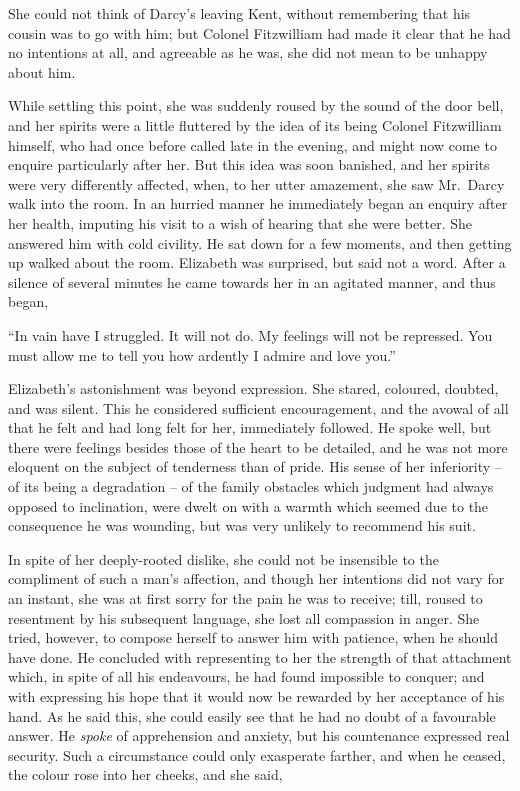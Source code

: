 She could not think of Darcy’s leaving Kent, without
remembering that his cousin was to go with him; but
Colonel Fitzwilliam had made it clear that he had no
intentions at all, and agreeable as he was, she did not
mean to be unhappy about him.

While settling this point, she was suddenly roused by
the sound of the door bell, and her spirits were a little
fluttered by the idea of its being Colonel Fitzwilliam
himself, who had once before called late in the evening,
and might now come to enquire particularly after her.
But this idea was soon banished, and her spirits were
very differently affected, when, to her utter amazement,
she saw Mr.\ Darcy walk into the room. In an hurried
manner he immediately began an enquiry after her health,
imputing his visit to a wish of hearing that she were
better. She answered him with cold civility. He sat
down for a few moments, and then getting up walked
about the room. Elizabeth was surprised, but said not
a word. After a silence of several minutes he came
towards her in an agitated manner, and thus began,

“In vain have I struggled. It will not do. My feelings
will not be repressed. You must allow me to tell you
how ardently I admire and love you.”

Elizabeth’s astonishment was beyond expression. She
stared, coloured, doubted, and was silent. This he considered
sufficient encouragement, and the avowal of all
that he felt and had long felt for her, immediately followed.
He spoke well, but there were feelings besides those of the
heart to be detailed, and he was not more eloquent on the
subject of tenderness than of pride. His sense of her
inferiority -- of its being a degradation -- of the family
obstacles which judgment had always opposed to inclination,
were dwelt on with a warmth which seemed due
to the consequence he was wounding, but was very unlikely
to recommend his suit.

In spite of her deeply-rooted dislike, she could not be
insensible to the compliment of such a man’s affection,
and though her intentions did not vary for an instant,
she was at first sorry for the pain he was to receive; till,
roused to resentment by his subsequent language, she lost
all compassion in anger. She tried, however, to compose
herself to answer him with patience, when he should have
done. He concluded with representing to her the strength
of that attachment which, in spite of all his endeavours,
he had found impossible to conquer; and with expressing
his hope that it would now be rewarded by her acceptance
of his hand. As he said this, she could easily see that he
had no doubt of a favourable answer. He \textit{spoke} of apprehension
and anxiety, but his countenance expressed real
security. Such a circumstance could only exasperate
farther, and when he ceased, the colour rose into her cheeks,
and she said,

